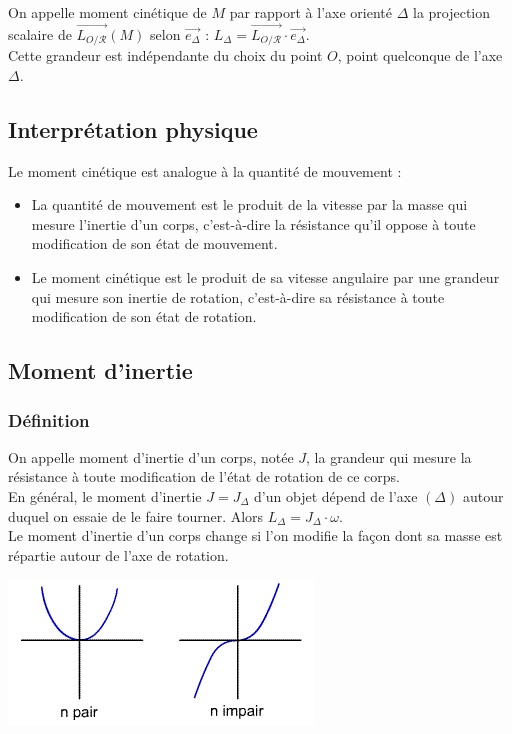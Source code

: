 \documentclass[a4paper,10pt]{book} %
\begin{document}
On appelle moment cinétique de $M$ par rapport à l'axe orienté $\Delta$ la projection scalaire de $\overrightarrow{L_{O/\mathcal{R}}}(M)$ selon $\overrightarrow{e_\Delta}$ : $L_\Delta = \overrightarrow{L_{O/\mathcal{R}}}\cdot \overrightarrow{e_\Delta}$.\\

Cette grandeur est indépendante du choix du point $O$, point quelconque de l'axe $\Delta$.

\newpage

\subsection{Interprétation physique}
Le moment cinétique est analogue à la quantité de mouvement :
\begin{itemize}
\item La quantité de mouvement est le produit de la vitesse par la masse qui mesure l'inertie d'un corps, c'est-à-dire la résistance qu'il oppose à toute modification de son état de mouvement.
\item Le moment cinétique est le produit de sa vitesse angulaire par une grandeur qui mesure son inertie de rotation, c'est-à-dire sa résistance à toute modification de son état de rotation.
\end{itemize}\bigskip

\subsection{Moment d'inertie}
\subsubsection{Définition}
On appelle moment d'inertie d'un corps, notée $J$, la grandeur qui mesure la résistance à toute modification de l'état de rotation de ce corps.\\

En général, le moment d'inertie $J=J_\Delta$ d'un objet dépend de l'axe $(\Delta)$ autour duquel on essaie de le faire tourner. Alors $L_\Delta=J_\Delta\cdot \omega$.\\

Le moment d’inertie d’un corps change si l’on modifie la façon dont sa masse est répartie autour de l’axe de rotation.

\begin{center}\includegraphics[scale=0.65]{images/008.png}\end{center}
\end{document}
